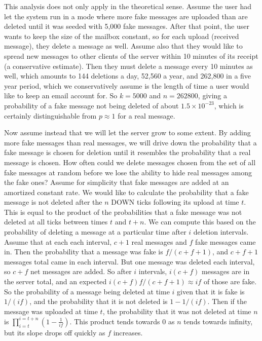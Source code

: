 \documentclass[pageno]{jpaper}
\begin{document}
This analysis does not only apply in the theoretical sense. Assume the user had let the system run in a mode where more fake messages are uploaded than are deleted until it was seeded with 5,000 fake messages. After that point, the user wants to keep the size of the mailbox constant, so for each upload (received message), they delete a message as well. Assume also that they would like to spread new messages to other clients of the server within 10 minutes of its receipt (a conservative estimate). Then they must delete a message every 10 minutes as well, which amounts to 144 deletions a day, 52,560 a year, and 262,800 in a five year period, which we conservatively assume is the length of time a user would like to keep an email account for. So $k=5000$ and $n=262800$, giving a probability of a fake message not being deleted of about $1.5\times10^{-23}$, which is certainly distinguishable from $p \approx 1$ for a real message.

Now assume instead that we will let the server grow to some extent. By adding more fake messages than real messages, we will drive down the probability that a fake message is chosen for deletion until it resembles the probability that a real message is chosen. How often could we delete messages chosen from the set of all fake messages at random before we lose the ability to hide real messages among the fake ones? Assume for simplicity that fake messages are added at an amortized constant rate. We would like to calculate the probability that a fake message is not deleted after the $n$ DOWN ticks following its upload at time $t$. This is equal to the product of the probabilities that a fake message was not deleted at all ticks between times $t$ and $t+n$. We can compute this based on the probability of deleting a message at a particular time after $i$ deletion intervals. Assume that at each each interval, $c+1$ real messages and $f$ fake messages came in. Then the probability that a message was fake is $f/(c+f+1)$, and $c+f+1$ messages total came in each interval. But one message was deleted each interval, so $c+f$ net messages are added. So after $i$ intervals, $i(c+f)$ messages are in the server total, and an expected $i(c+f)f/(c+f+1)\approx if$ of those are fake. So the probability of a message being deleted at time $i$ given that it is fake is $1/(if)$, and the probability that it is not deleted is $1-1/(if)$. Then if the message was uploaded at time $t$, the probability that it was not deleted at time $n$ is $\displaystyle\prod_{i=t}^{i=t+n}(1-\frac{1}{if})$. This product tends towards 0 as $n$ tends towards infinity, but its slope drops off quickly as $f$ increases.
\end{document}
